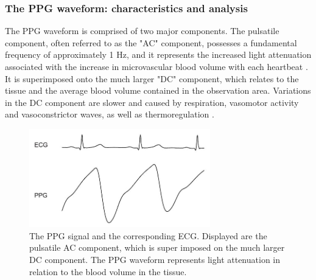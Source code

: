 \subsubsection{The PPG waveform: characteristics and analysis} 
The PPG waveform is comprised of two major components. The pulsatile component, often referred to as the "AC" component, possesses a fundamental frequency of approximately 1 Hz, and it represents the increased light attenuation associated with the increase in microvascular blood volume with each heartbeat \cite{Allan2007}. It is superimposed onto the much larger "DC" component, which relates to the tissue and the average blood volume contained in the observation area. Variations in the DC component are slower and caused by respiration, vasomotor activity and vasoconstrictor waves, as well as thermoregulation \cite{Allan2007}.\\ 

\begin{figure}[ht]
	\centering
  \includegraphics[width=0.7\textwidth, angle=0]{images/ppg_raw.jpg}
	\caption[PPG signal]{The PPG signal and the corresponding ECG. Displayed are the pulsatile AC component, which is super imposed on the much larger DC component. The PPG waveform represents light attenuation in relation to the blood volume in the tissue.}
	\label{ppg_pw}
\end{figure}


